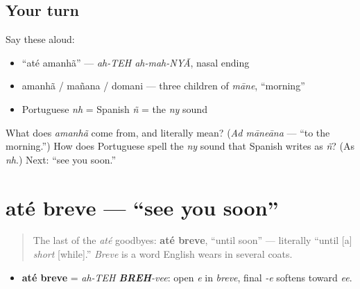 \subsection*{Your turn}
Say these aloud:

\begin{itemize}
\raggedright
  \item \textquotedblleft{}até amanhã\textquotedblright{} — \emph{ah-TEH ah-mah-NYÃ}, nasal ending
  \item amanhã / mañana / domani — three children of \emph{māne}, \textquotedblleft{}morning\textquotedblright{}
  \item Portuguese \emph{nh} = Spanish \emph{ñ} = the \emph{ny} sound
\end{itemize}

\begin{tcolorbox}[breakable,colback=teal!4,colframe=teal!35!black,title={Before you move on}]
What does \emph{amanhã} come from, and literally mean? (\emph{Ad māneāna} — \textquotedblleft{}to the morning.\textquotedblright{}) How does Portuguese spell the \emph{ny} sound that Spanish writes as \emph{ñ}? (As \emph{nh}.) Next: \textquotedblleft{}see you soon.\textquotedblright{}
\end{tcolorbox}
\section[até breve]{até breve — \textquotedblleft{}see you soon\textquotedblright{}}

\label{lesson:PT-C04-ate-breve}



\begin{quote}
The last of the \emph{até} goodbyes: \textbf{até breve}, \textquotedblleft{}until soon\textquotedblright{} — literally \textquotedblleft{}until {[}a{]} \emph{short} {[}while{]}.\textquotedblright{} \emph{Breve} is a word English wears in several coats.
\end{quote}

\begin{sounds}
\begin{itemize}
\raggedright
  \item \textbf{até breve} = \emph{ah-TEH \textbf{BREH}-vee}: open \emph{e} in \emph{breve}, final \emph{-e} softens toward \emph{ee}.
\end{itemize}
\end{sounds}

